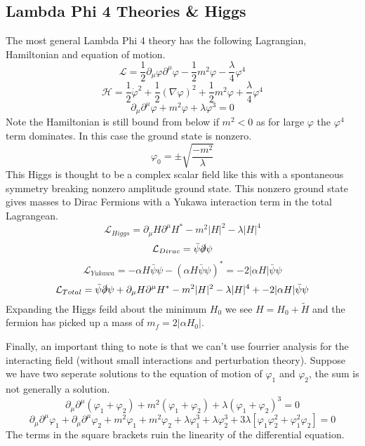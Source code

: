 \documentclass[11pt, oneside]{report}  %
\numberwithin{equation}{section}
\begin{document}
\subsection{Lambda Phi 4 Theories \& Higgs }
The most general Lambda Phi 4 theory has the following Lagrangian, Hamiltonian and equation of motion.
$$ \mathcal{L} = \frac{1}{2}\partial_\mu\varphi \partial^\mu \varphi - \frac{1}{2}m^2 \varphi-\frac{\lambda}{4}\varphi^4$$
$$ \mathcal{H} = \frac{1}{2}\dot\varphi^2 + \frac{1}{2}(\nabla\varphi)^2+\frac{1}{2}m^2 \varphi+\frac{\lambda}{4}\varphi^4$$
$$ \partial_\mu\partial^\mu\varphi +m^2\varphi + \lambda \varphi^3 =0$$
Note the Hamiltonian is still bound from below if $m^2<0$ as for large $\varphi$ the $\varphi^4$ term dominates. In this case the ground state is nonzero.
$$ \varphi_0 = \pm\sqrt{\frac{-m^2}{\lambda}}$$
This Higgs is thought to be a complex scalar field like this with a spontaneous symmetry breaking nonzero amplitude ground state. This nonzero ground state gives masses to Dirac Fermions with a Yukawa interaction term in the total Lagrangean.
$$ \mathcal{L}_{Higgs} = \partial_\mu H \partial^\mu H^* - m^2 |H|^2 - \lambda |H|^4$$
$$ \mathcal{L}_{Dirac} = \bar \psi\slashed{\partial}\psi$$
$$ \mathcal{L}_{Yukawa} = -\alpha H \bar\psi\psi - \left( \alpha H \bar\psi\psi \right)^* = -2|\alpha H| \bar\psi\psi$$
$$ \mathcal{L}_{Total} = \bar \psi\slashed{\partial}\psi + \partial_\mu H \partial^\mu H^* - m^2 |H|^2 - \lambda |H|^4 + -2|\alpha H| \bar\psi\psi$$
Expanding the Higgs feild about the minimum $H_0$ we see $H = H_0 +\tilde H$ and the fermion has picked up a mass of $m_f = 2|\alpha H_0|$.

Finally, an important thing to note is that we can't use fourrier analysis for the interacting field (without small interactions and perturbation theory). Suppose we have two seperate solutions to the equation of motion of $\varphi_1$ and $\varphi_2$, the sum is not generally a solution.
$$ \partial_\mu \partial^\mu(\varphi_1 + \varphi_2) + m^2(\varphi_1 + \varphi_2) + \lambda (\varphi_1 + \varphi_2)^3 =0$$
$$ \partial_\mu \partial^\mu\varphi_1 +  \partial_\mu \partial^\mu\varphi_2 + m^2\varphi_1 + m^2\varphi_2 + \lambda \varphi_1^3 +  \lambda\varphi_2^3 + 3\lambda[\varphi_1\varphi_2^2 + \varphi_1^2\varphi_2]=0$$
The terms in the square brackets ruin the linearity of the differential equation.
\end{document}
